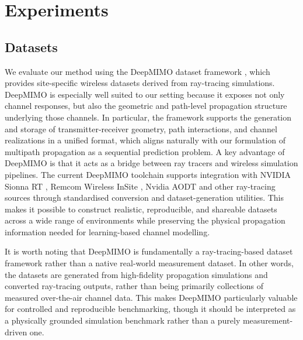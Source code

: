 \section{Experiments}
\subsection{Datasets}


We evaluate our method using the DeepMIMO dataset framework \cite{DBLP:journals/corr/abs-1902-06435}, which provides site-specific wireless datasets derived from ray-tracing simulations. DeepMIMO is especially well suited to our setting because it exposes not only channel responses, but also the geometric and path-level propagation structure underlying those channels. In particular, the framework supports the generation and storage of transmitter-receiver geometry, path interactions, and channel realizations in a unified format, which aligns naturally with our formulation of multipath propagation as a sequential prediction problem.  A key advantage of DeepMIMO is that it acts as a bridge between ray tracers and wireless simulation pipelines. The current DeepMIMO toolchain supports integration with NVIDIA Sionna RT \cite{hoydis2023sionnaopensourcelibrarynextgeneration}, Remcom Wireless InSite \cite{remcom}, Nvidia AODT \cite{aodt} and other ray-tracing sources through standardised conversion and dataset-generation utilities. This makes it possible to construct realistic, reproducible, and shareable datasets across a wide range of environments while preserving the physical propagation information needed for learning-based channel modelling.



It is worth noting that DeepMIMO is fundamentally a ray-tracing-based dataset framework rather than a native real-world measurement dataset. In other words, the datasets are generated from high-fidelity propagation simulations and converted ray-tracing outputs, rather than being primarily collections of measured over-the-air channel data. This makes DeepMIMO particularly valuable for controlled and reproducible benchmarking, though it should be interpreted as a physically grounded simulation benchmark rather than a purely measurement-driven one.


